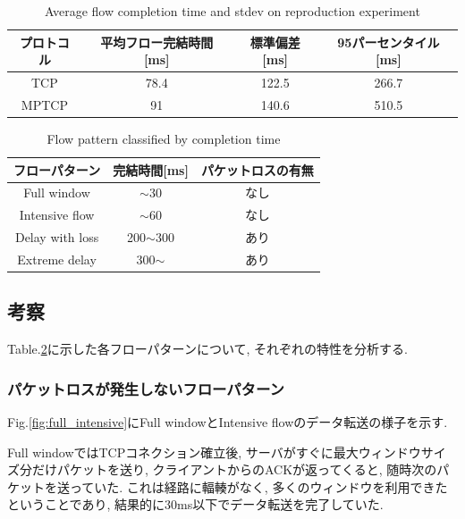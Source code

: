\begin{table}[t]
\begin{center}
\caption{Average flow completion time and stdev on reproduction experiment}
\begin{tabular}{c|c|c|c}
\hline
プロトコル & 平均フロー完結時間[ms] & 標準偏差[ms] & 95パーセンタイル[ms] \\ \hline \hline 
TCP & 78.4 & 122.5 & 266.7 \\
MPTCP & 91 & 140.6 & 510.5 \\
\hline
\end{tabular}
\label{table:short_flow_rep}
\end{center}
\end{table}

\begin{table}[t]
\begin{center}
\caption{Flow pattern classified by completion time}
\begin{tabular}{c|c|c}
\hline
フローパターン & 完結時間[ms] & パケットロスの有無 \\ \hline \hline
Full window & $\sim$30 & なし\\
Intensive flow & $\sim$60 & なし\\
Delay with loss & 200$\sim$300 & あり\\
Extreme delay & 300$\sim$ & あり\\
\hline
\end{tabular}
\label{table:flow_pattern}
\end{center}
\end{table}


\subsection{考察}
Table.\ref{table:flow_pattern}に示した各フローパターンについて, それぞれの特性を分析する.

\subsubsection{パケットロスが発生しないフローパターン}
Fig.\ref{fig:full_intensive}にFull windowとIntensive flowのデータ転送の様子を示す.

Full windowではTCPコネクション確立後, サーバがすぐに最大ウィンドウサイズ分だけパケットを送り,
クライアントからのACKが返ってくると, 随時次のパケットを送っていた.
これは経路に輻輳がなく, 多くのウィンドウを利用できたということであり, 結果的に30ms以下でデータ転送を完了していた.

